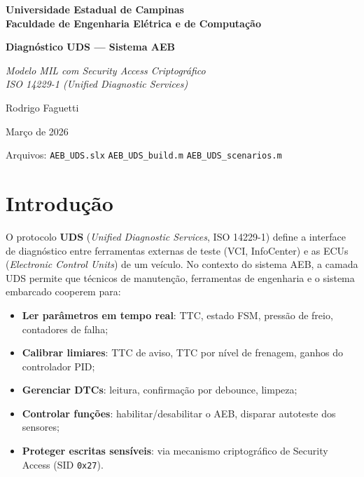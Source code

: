 \documentclass[12pt,a4paper]{article}
\newcommand{\sid}[1]{\texttt{0x#1}}
\begin{document}
\begin{titlepage}
    \centering
    \vspace*{2cm}
    {\Large\bfseries Universidade Estadual de Campinas\\[0.5em]
     Faculdade de Engenharia Elétrica e de Computação\par}
    \vspace{3cm}
    {\Huge\bfseries Diagnóstico UDS --- Sistema AEB\par}
    \vspace{0.5em}
    {\Large\itshape Modelo MIL com Security Access Criptográfico\\
     ISO 14229-1 (Unified Diagnostic Services)\par}
    \vspace{3cm}
    {\large Rodrigo Faguetti\par}
    \vspace{1em}
    {\large Março de 2026\par}
    \vfill
    {\small Arquivos: \texttt{AEB\_UDS.slx} \textbullet{}
                     \texttt{AEB\_UDS\_build.m} \textbullet{}
                     \texttt{AEB\_UDS\_scenarios.m}}
\end{titlepage}

\tableofcontents
\newpage

\section{Introdução}
\label{sec:intro}

O protocolo \textbf{UDS} (\textit{Unified Diagnostic Services}, ISO 14229-1)
define a interface de diagnóstico entre ferramentas externas de teste (VCI,
InfoCenter) e as ECUs (\textit{Electronic Control Units}) de um veículo. No
contexto do sistema AEB, a camada UDS permite que técnicos de manutenção,
ferramentas de engenharia e o sistema embarcado cooperem para:

\begin{itemize}[noitemsep]
    \item \textbf{Ler parâmetros em tempo real}: TTC, estado FSM, pressão de
          freio, contadores de falha;
    \item \textbf{Calibrar limiares}: TTC de aviso, TTC por nível de frenagem,
          ganhos do controlador PID;
    \item \textbf{Gerenciar DTCs}: leitura, confirmação por debounce, limpeza;
    \item \textbf{Controlar funções}: habilitar/desabilitar o AEB, disparar
          autoteste dos sensores;
    \item \textbf{Proteger escritas sensíveis}: via mecanismo criptográfico
          de Security Access (SID \sid{27}).
\end{itemize}
\end{document}
